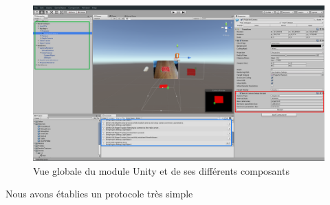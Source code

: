 \begin{figure}[H]
\centering
\includegraphics[width=\linewidth]{images/unity-plugin}
\caption{Vue globale du module Unity et de ses différents composants}
\end{figure}




Nous avons établies un protocole très simple

